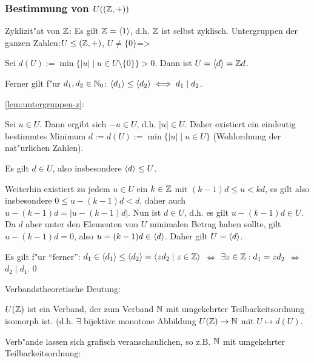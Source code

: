 \subsubsection*{Bestimmung von $U((\mathbb Z,+))$}
\remark Zyklizit"at von $\mathbb Z$:{
  Es gilt $\mathbb Z={\left\langle1\right\rangle}$, d.h. $\mathbb Z$ ist selbst zyklisch.
  }
\lemma Untergruppen der ganzen Zahlen:$U\leq (\mathbb Z,+)$, $U\neq\{0\}$=>{
  \label{lem:untergruppen-z}
  Sei $d(U):=\min\{|u|\mid u\in U\setminus\{0\} \}>0$. Dann ist
  $U={\left\langle d\right\rangle}=\mathbb Z d$.
  
  Ferner gilt f"ur $d_1,d_2\in\mathbb N_0$: ${\left\langle d_1\right\rangle}\leq {\left\langle d_2\right\rangle}\iff d_1\mid d_2$.
  }
\proof \ref{lem:untergruppen-z}:{
  Sei $u\in U$. Dann ergibt sich $-u\in U$, d.h. $|u|\in U$. Daher
  existiert ein eindeutig bestimmtes Minimum $d:=d(U):=\min\{ |u|\mid u\in U\}$
  (Wohlordnung der nat"urlichen Zahlen).
  
  Es gilt $d\in U$, also insbesondere ${\left\langle d\right\rangle}\leq U$.
  
  Weiterhin existiert zu jedem $u\in U$ ein $k\in \mathbb Z$ mit $(k-1)d\leq u< kd$,
  es gilt also insbesondere $0\leq u-(k-1)d<d$, daher auch $u-(k-1)d=|u-(k-1)d|$.
  Nun ist $d\in U$, d.h. es gilt $u-(k-1)d\in U$. Da $d$ aber unter den
  Elementen von $U$ minimalen Betrag haben sollte, gilt $u-(k-1)d=0$,
  also $u=(k-1)d\in {\left\langle d\right\rangle}$. Daher gilt $U={\left\langle d\right\rangle}$.
  
  Es gilt f"ur ``ferner'': $d_1\in{\left\langle d_1\right\rangle}\leq {\left\langle d_2\right\rangle} = {\left\langle zd_2\mid z\in\mathbb Z\right\rangle}$
  $\iff$ $\exists z\in\mathbb Z:d_1=zd_2$ $\iff$ $d_2\mid d_1$.\qed
  }
\remark Verbandstheoretische Deutung:{
  $U(\mathbb Z)$ ist ein Verband, der zum Verband $\mathbb N$ mit
  umgekehrter Teilbarkeitsordnung isomorph ist. (d.h. $\exists$
  bijektive monotone Abbildung $U(\mathbb Z)\to \mathbb N$ mit $U\mapsto d(U)$.
  
  Verb"ande lassen sich grafisch veranschaulichen, so z.B.
  $\mathbb N$ mit umgekehrter Teilbarkeitsordnung:
  }
